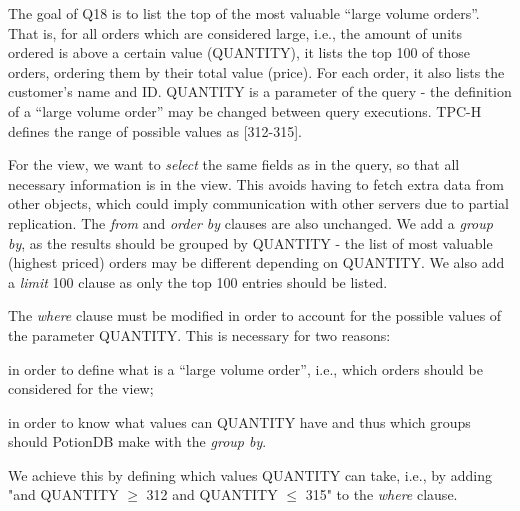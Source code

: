 \documentclass[sigplan,review,anonymous]{acmart}
\begin{document}

The goal of Q18 is to list the top of the most valuable ``large volume orders''.
That is, for all orders which are considered large, i.e., the amount of units ordered is above a certain value (QUANTITY), it lists the top 100 of those orders, ordering them by their total value (price).
For each order, it also lists the customer's name and ID.
QUANTITY is a parameter of the query - the definition of a ``large volume order'' may be changed between query executions.
TPC-H defines the range of possible values as [312-315].	%

For the view, we want to \emph{select} the same fields as in the query, so that all necessary information is in the view.
This avoids having to fetch extra data from other objects, which could imply communication with other servers due to partial replication.
The \emph{from} and \emph{order by} clauses are also unchanged. %
We add a \emph{group by}, as the results should be grouped by QUANTITY - the list of most valuable (highest priced) orders may be different depending on QUANTITY. %
We also add a \emph{limit} 100 clause as only the top 100 entries should be listed.

The \emph{where} clause must be modified in order to account for the possible values of the parameter QUANTITY.
This is necessary for two reasons:
\begin{enumerate*}
	\item in order to define what is a ``large volume order'', i.e., which orders should be considered for the view;
	\item in order to know what values can QUANTITY have and thus which groups should PotionDB make with the \emph{group by}.
\end{enumerate*}
We achieve this by defining which values QUANTITY can take, i.e., by adding "and QUANTITY $\geq$ 312 and QUANTITY $\leq$ 315" to the \emph{where} clause.
\end{document}
